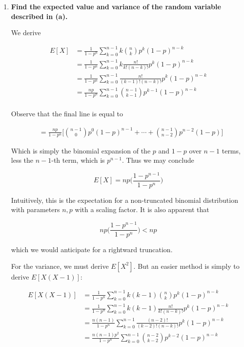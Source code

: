 \documentclass[10pt, oneside]{article}
\begin{document}
\begin{enumerate}[label=9.\arabic*]
\begin{enumerate}
	\item  \begin{tcolorbox}[
	  colback=Cerulean!5!white,
	  colframe=Cerulean!75!black]
	\textbf{Find the expected value and variance of the random variable described in (a).}
	\end{tcolorbox}
	
	We derive
	
	\begin{align*}
	E[X] &= \frac{1}{1-p^n} \sum^{n-1}_{k=0} k \binom{n}{k} p^k (1-p)^{n-k} \\
	&= \frac{1}{1-p^n} \sum^{n-1}_{k=0} k \frac{n!}{k! (n-k)!} p^k (1-p)^{n-k} \\
	&= \frac{1}{1-p^n} \sum^{n-1}_{k=0} \frac{n!}{(k-1)! (n-k)!} p^k (1-p)^{n-k} \\
	&= \frac{np}{1-p^n} \sum^{n-1}_{k=0} \binom{n-1}{k-1} p^{k-1} (1-p)^{n-k} \\
	\end{align*}
	
	Observe that the final line is equal to
	
	\begin{align*}
	&= \frac{np}{1-p^n} \bigg[ \binom{n-1}{0} p^0 (1-p)^{n-1} + \cdots + \binom{n-1}{n-2} p^{n-2} (1-p) \bigg]
	\end{align*}
	
	Which is simply the binomial expansion of the $p$ and $1-p$ over $n-1$ terms, less the $n-1$-th term, which is $p^{n-1}$. Thus we may conclude
	
	\[ \boxed{ E[X] = np \bigg( \frac{1-p^{n-1}}{1-p^n} \bigg) } \]
	
	Intuitively, this is the expectation for a non-truncated binomial distribution with parameters $n, p$ with a scaling factor. It is also apparent that
	
	\[ np \bigg( \frac{1-p^{n-1}}{1-p^n} \bigg)  < np \]
	
	which we would anticipate for a rightward truncation. 
	
	For the variance, we must derive $E[X^2]$. But an easier method is simply to derive $E[X(X-1)]$:
	
	\begin{align*}
	E[X(X-1)] &= \frac{1}{1-p^n} \sum^{n-1}_{k=0} k(k-1) \binom{n}{k} p^k (1-p)^{n-k} \\
	&= \frac{1}{1-p^n} \sum^{n-1}_{k=0} k(k-1) \frac{n!}{k! (n-k)!} p^k (1-p)^{n-k} \\
	&= \frac{n(n-1)}{1-p^n} \sum^{n-1}_{k=0} \frac{(n-2)!}{(k-2)! (n-k)!} p^k (1-p)^{n-k} \\
	&= \frac{n(n-1)p^2}{1-p^n} \sum^{n-1}_{k=0} \binom{n-2}{k-2} p^{k-2} (1-p)^{n-k}
	\end{align*}
	

\end{enumerate}
\end{enumerate}
\end{document}
